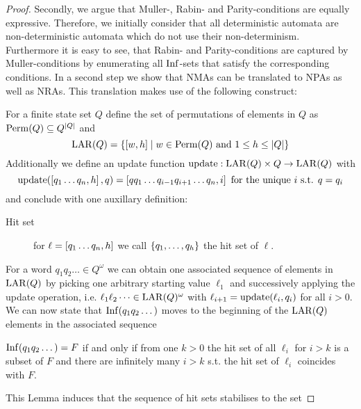 \begin{proof}
  Secondly, we argue that Muller-, Rabin- and Parity-conditions are
  equally expressive. Therefore, we initially consider that all deterministic
  automata are non-deterministic automata which do not use their
  non-determinism. Furthermore it is easy to see, that Rabin- and
  Parity-conditions are captured by Muller-conditions by enumerating all
  $\operatorname{Inf}$-sets that satisfy the corresponding conditions. In a second step we
  show that \acp{NMA} can be translated to \acp{NPA} as well as \acp{NRA}. This
  translation makes use of the following construct:
  \begin{definition}
    For a finite state set $Q$ define the set of permutations of elements in
    $Q$ as $\operatorname{Perm}(Q)\subseteq Q^{\left\vert{Q}\right\vert}$ and
    \begin{equation*}
      \operatorname{LAR}(Q) = \left\{\left[w,h\right]\mid w\in\operatorname{Perm}(Q)\text{ and }1\leq
      h\leq\left\vert{Q}\right\vert\right\}
    \end{equation*}
    Additionally we define an update function
    $\operatorname{update}:\operatorname{LAR}(Q)\times Q\rightarrow\operatorname{LAR}(Q)$ with
    \begin{equation*}
      \operatorname{update}(\left[q_{1}\dots q_{n},h\right], q)
      = \left[qq_{1}\dots q_{i-1}q_{i+1}\dots q_{n},i\right]
      \text{ for the unique }i\text{ s.t. }q=q_{i}
    \end{equation*}
    and conclude with one auxillary definition:
    \begin{description}
      \item [Hit set] for $\ell = \left[q_{1}\dots q_{n},h\right]$ we call
        $\left\{q_{1},\dots,q_{h}\right\}$ the hit set of $\ell$.
    \end{description}
  \end{definition}
  For a word $q_{1}q_{2}\dots\in Q^{\omega}$ we can obtain one associated
  sequence of elements in $\operatorname{LAR}(Q)$ by picking one arbitrary starting value
  $\ell_{1}$ and successively applying the update operation, i.e.
  $\ell_{1}\ell_{2}\dots\in\operatorname{LAR}(Q)^{\omega}$ with
  $\ell_{i+1} = \operatorname{update}(\ell_{i},q_{i})$ for all $i>0$. We can now state that
  $\operatorname{Inf}(q_{1}q_{2}\dots)$ moves to the beginning of the $\operatorname{LAR}(Q)$ elements in
  the associated sequence
  \begin{lemma}
    \cite[Lemma 1.21]{AutoLogInfGames}
    $\operatorname{Inf}(q_{1}q_{2}\dots) = F$ if and only if from one $k>0$ the hit set of
    all $\ell_{i}$ for $i>k$ is a subset of $F$ and there are infinitely many
    $i>k$ s.t. the hit set of $\ell_{i}$ coincides with $F$.
    \label{lem:larhitset}
  \end{lemma}
  This Lemma induces that the sequence of hit sets stabilises to the set

\end{proof}
